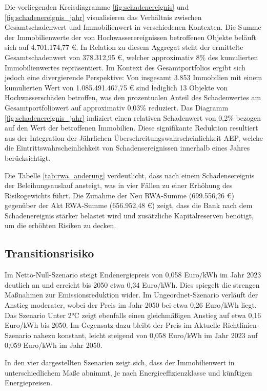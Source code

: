 Die vorliegenden Kreisdiagramme \ref{fig:schadenereignis} und \ref{fig:schadenereignis_jahr} visualisieren das Verhältnis zwischen Gesamtschadenwert und Immobilienwert in verschiedenen Kontexten. Die Summe der Immobilienwerte der von Hochwasserereignissen betroffenen Objekte beläuft sich auf 4.701.174,77 €. In Relation zu diesem Aggregat steht der ermittelte Gesamtschadenwert von 378.312,95 €, welcher approximativ 8\% des kumulierten Immobilienwertes repräsentiert. Im Kontext des Gesamtportfolios ergibt sich jedoch eine divergierende Perspektive: Von insgesamt 3.853 Immobilien mit einem kumulierten Wert von 1.085.491.467,75 € sind lediglich 13 Objekte von Hochwasserschäden betroffen, was den prozentualen Anteil des Schadenwertes am Gesamtportfoliowert auf approximativ 0,03\% reduziert. Das Diagramm \ref{fig:schadenereignis_jahr} indiziert einen relativen Schadenwert von 0,2\% bezogen auf den Wert der betroffenen Immobilien. Diese signifikante Reduktion resultiert aus der Integration der Jährlichen Überschreitungswahrscheinlichkeit \ac{AEP}, welche die Eintrittswahrscheinlichkeit von Schadensereignissen innerhalb eines Jahres berücksichtigt.

Die Tabelle \ref{tab:rwa_anderung} verdeutlicht, dass nach einem Schadensereignis der Beleihungsauslauf ansteigt, was in vier Fällen zu einer Erhöhung des Risikogewichts  führt. Die Zunahme der Neu RWA-Summe (699.556,26 €) gegenüber der Akt RWA-Summe (656.952,48 €) zeigt, dass die Bank nach dem Schadenereignis stärker belastet wird und zusätzliche Kapitalreserven benötigt, um die erhöhten Risiken zu decken.


\subsection{Transitionsrisiko}

Im Netto-Null-Szenario steigt Endenergiepreis von 0,058 Euro/kWh im Jahr 2023 deutlich an und erreicht bis 2050 etwa 0,34 Euro/kWh. Dies spiegelt die strengen Maßnahmen zur Emissionsreduktion wider. Im Ungeordnet-Szenario verläuft der Anstieg moderater, wobei der Preis im Jahr 2050 bei etwa 0,26 Euro/kWh liegt. Das Szenario Unter 2°C zeigt ebenfalls einen gleichmäßigen Anstieg auf etwa 0,16 Euro/kWh bis 2050. Im Gegensatz dazu bleibt der Preis im Aktuelle Richtlinien-Szenario nahezu konstant, leicht steigend von 0,058 Euro/kWh im Jahr 2023 auf 0,059 Euro/kWh im Jahr 2050.

In den vier dargestellten Szenarien zeigt sich, dass der Immobilienwert in unterschiedlichem Maße abnimmt, je nach Energieeffizienzklasse und künftigen Energiepreisen. 

